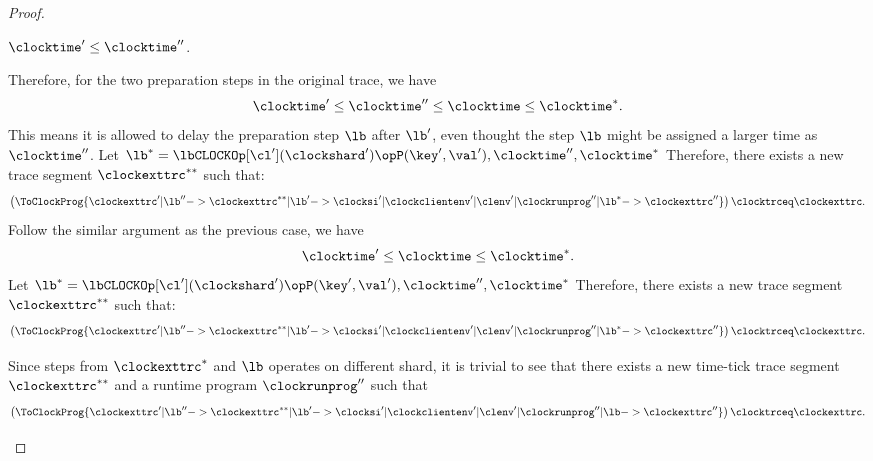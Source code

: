 \begin{proof}
\begin{enumerate}
\begin{enumerate}
\begin{enumerate}
\begin{enumerate*}
            \( \clocktime' \leq \clocktime'' \).
            \end{enumerate*} 
            Therefore, for the two preparation steps in the original trace,  
            we have
            \[
                \clocktime' \leq \clocktime'' \leq \clocktime \leq \clocktime^* .
            \]
            This means it is allowed to delay the preparation step \( \lb \) after \( \lb' \),
            even thought the step \( \lb \) might be assigned a larger time as \( \clocktime'' \).
            Let \( \lb^* = \lbCLOCKOp[\cl'](\clockshard'){\opP(\key',\val'),\clocktime'',{\clocktime}^{*}} \) 
            Therefore, there exists a new trace segment \(  \clockexttrc^{**} \) such that:
            \[
            \left( \ToClockProg{\clockexttrc' | \lb''
                            -> \clockexttrc^{**} | \lb' -> 
                            \clocksi' | \clockclientenv' | \clenv' 
                                        | \clockrunprog'' | \lb^*
                            -> \clockexttrc''} \right)
            \clocktrceq \clockexttrc .
            \]
            Follow the similar argument as the previous case,
            we have 
            \[
                \clocktime' \leq \clocktime \leq \clocktime^* .
            \]
            Let \( \lb^* = \lbCLOCKOp[\cl'](\clockshard'){\opP(\key',\val'),\clocktime'',{\clocktime}^{*}} \) 
            Therefore, there exists a new trace segment \(  \clockexttrc^{**} \) such that:
            \[
            \left( \ToClockProg{\clockexttrc' | \lb''
                            -> \clockexttrc^{**} | \lb' -> 
                            \clocksi' | \clockclientenv' | \clenv' 
                                        | \clockrunprog'' | \lb^*
                            -> \clockexttrc''} \right)
            \clocktrceq \clockexttrc .
            \]
        \end{enumerate}
        Since steps from \( \clockexttrc^{*} \) and \( \lb \) operates on different shard,
        it is trivial to see that 
        there exists a new time-tick trace segment \( \clockexttrc^{**} \) 
        and a runtime program \( \clockrunprog'' \) such that
        \[
        \left( \ToClockProg{\clockexttrc' | \lb''
                        -> \clockexttrc^{**} | \lb' -> 
                        \clocksi' | \clockclientenv' | \clenv' 
                                    | \clockrunprog'' | \lb 
                        -> \clockexttrc''} \right)
        \clocktrceq \clockexttrc . \qedhere
        \]
    \end{enumerate}
\end{enumerate}
\end{proof}

